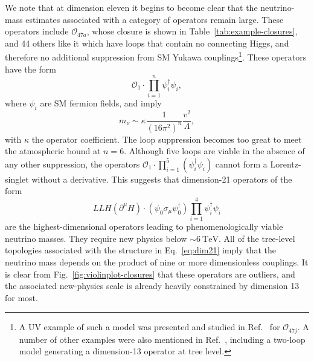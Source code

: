 We note that at dimension eleven it begins to become clear that the
neutrino-mass estimates associated with a category of operators remain large.
These operators include $\mathcal{O}_{47a}$, whose closure is shown in
Table~\ref{tab:example-closures}, and 44 others like it which have loops that
contain no connecting Higgs, and therefore no additional suppression from SM
Yukawa couplings\footnote{A UV example of such a model was presented and studied
  in Ref.~\cite{Gargalionis:2019drk} for $\mathcal{O}_{47j}$. A number of other
  examples were also mentioned in Ref.~\cite{Babu:2019mfe}, including a two-loop
  model generating a dimension-13 operator at tree level.}. These operators have
the form
\begin{equation}
  \label{eq:unsuppressed-ops}
\mathcal{O}_{1} \cdot \prod_{i=1}^{n} \psi_{i}^{\dagger} \psi_{i},
\end{equation}
where $\psi_{i}$ are SM fermion fields, and imply
\begin{equation}
  m_{\nu} \sim \kappa \frac{1}{(16\pi^{2})^{n}} \frac{v^{2}}{\Lambda},
\end{equation}
with $\kappa$ the operator coefficient. The loop suppression becomes too great
to meet the atmospheric bound at $n=6$. Although five loops are viable in the
absence of any other suppression, the operators
$\mathcal{O}_{1} \cdot \prod_{i=1}^{5} (\psi_{i}^{\dagger} \psi_{i})$ cannot
form a Lorentz-singlet without a derivative. This suggests that dimension-21
operators of the form
\begin{equation}
  \label{eq:dim21}
  LLH(\partial^{\mu}H) \cdot (\psi_{0} \sigma_{\mu} \psi_{0}^{\dagger}) \prod_{i=1}^{4} \psi_{i}^{\dagger} \psi_{i}
\end{equation}
are the highest-dimensional operators leading to phenomenologically viable
neutrino masses. They require new physics below $\sim 6~\text{TeV}$. All of the
tree-level topologies associated with the structure in Eq.~\eqref{eq:dim21}
imply that the neutrino mass depends on the product of nine or more
dimensionless couplings. It is clear from Fig.~\ref{fig:violinplot-closures}
that these operators are outliers, and the associated new-physics scale is
already heavily constrained by dimension 13 for most.


